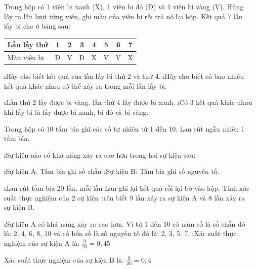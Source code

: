 \begin{bt}
	Trong hộp có 1 viên bi xanh (X), 1 viên bi đỏ (Đ) và 1 viên bi vàng (V). Hùng lấy ra lần lượt từng viên, ghi màu của viên bi rồi trả nó lại hộp. Kết quả 7 lần lấy bi cho ở bảng sau:
	\begin{center}
		\begin{tabular}{|l|c|c|c|c|c|c|c|}
			\hline
			Lần lấy thứ	&1&	2&	3&	4&	5&	6&	7\\
			\hline
			Màu viên bi&	Đ&	V&	Đ&	X&	V&	V&	X\\
			\hline
		\end{tabular}
	\end{center}
	\begin{enumerate}[a),leftmargin=*]
		\i Hãy cho biết kết quả của lần lấy bi thứ 2 và thứ 4.                                                                
		\i Hãy cho biết có bao nhiêu kết quả khác nhau có thể xảy ra trong mỗi lần lấy bi.
	\end{enumerate}        
	\begin{loigiaichuong42}
		\begin{enumerate}[a),leftmargin=*]
			\i Lần thứ 2 lấy được bi vàng, lần thứ 4 lấy được bi xanh.
			\i Có 3 kết quả khác nhau khi lấy bi là lấy được bi xanh, bi đỏ và bi vàng.
		\end{enumerate}
	\end{loigiaichuong42}
\end{bt}           
\begin{bt}
	Trong hộp có 10 tấm bìa ghi các số tự nhiên từ 1 đến 10. Lan rút ngẫu nhiên 1 tấm bìa.
	\begin{enumerate}[a),leftmargin=*]
		\i Sự kiện nào có khả năng xảy ra cao hơn trong hai sự kiện sau:
		\begin{enumerate}[+,leftmargin=*]
			\i Sự kiện A: Tấm bỉa ghi số chẵn
			\i Sự kiện B: Tấm bìa ghi số nguyên tố.
		\end{enumerate}
		\i Lan rút tấm bìa 20 lần, mỗi lần Lan ghi lại kết quả rồi lại bỏ vào hộp. Tính xác suất thực nghiệm của 2 sự kiện trên biết 9 lần xảy ra sự kiện A và 8 lần xảy ra sự kiện B. 
	\end{enumerate}
	\begin{loigiaichuong42}
		\begin{enumerate}[a),leftmargin=*]
			\i Sự kiện A có khả năng xảy ra cao hơn. Vì từ 1 đến 10 có năm số là số chẵn đó là: 2, 4, 6, 8, 10 và có bốn số là số nguyên tố đó là: 2, 3, 5, 7.
			\i Xác suất thực nghiệm của sự kiện A là: $\frac{9}{{20}} = 0,45$ 
			
			Xác suất thực nghiệm của sự kiện B là:  $\frac{8}{{20}} = 0,4$
		\end{enumerate}
	\end{loigiaichuong42}
\end{bt}
